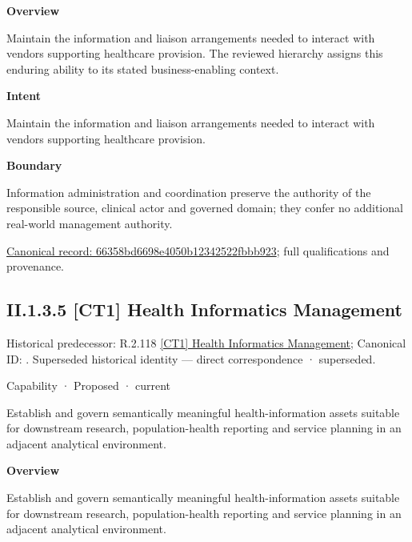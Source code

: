 \textbf{Overview}



Maintain the information and liaison arrangements needed to interact with vendors supporting healthcare provision. The reviewed hierarchy assigns this enduring ability to its stated business-enabling context.



\textbf{Intent}



Maintain the information and liaison arrangements needed to interact with vendors supporting healthcare provision.



\textbf{Boundary}



Information administration and coordination preserve the authority of the responsible source, clinical actor and governed domain; they confer no additional real-world management authority.


{\footnotesize \href{../../../../../../../continuum/strategy/capability/66358bd6698e4050b12342522fbbb923.md}{Canonical record: 66358bd6698e4050b12342522fbbb923}; full qualifications and provenance.}\par
\subsection*{II.1.3.5 [CT1] Health Informatics Management}
\label{navigation:II.1.3.5}

{\small Historical predecessor: R.2.118 \hyperref[element:50c56bac0dc540a2b392fc2376efc129]{[CT1] Health Informatics Management}; Canonical ID: \texttt{}. Superseded historical identity — direct correspondence · superseded.}\par
\label{element:a790b5f2c5a1497fa6ec09d7824da32e}
{\small Capability · Proposed · current}\par

Establish and govern semantically meaningful health-information assets suitable for downstream research, population-health reporting and service planning in an adjacent analytical environment.



\textbf{Overview}



Establish and govern semantically meaningful health-information assets suitable for downstream research, population-health reporting and service planning in an adjacent analytical environment.



